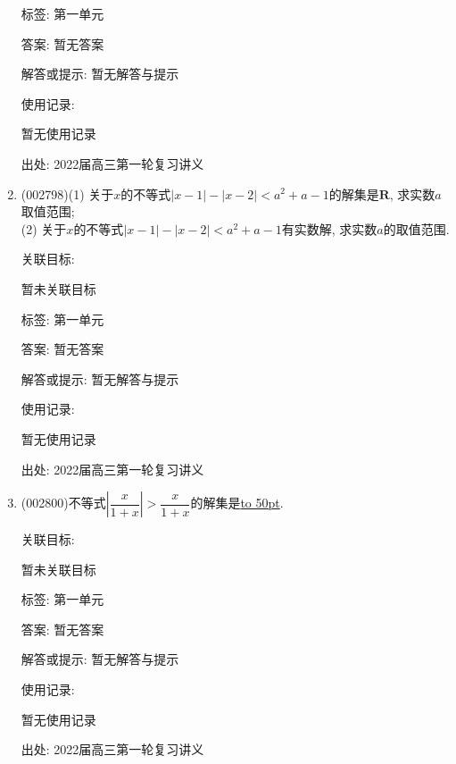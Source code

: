 \documentclass[10pt,a4paper]{article}
\newcommand{\blank}[1]{\underline{\hbox to #1pt{}}}
\begin{document}
\begin{enumerate}[1.]
标签: 第一单元

答案: 暂无答案

解答或提示: 暂无解答与提示

使用记录:

暂无使用记录


出处: 2022届高三第一轮复习讲义
\item { (002798)}(1) 关于$x$的不等式$|x-1|-|x-2|<a^2+a-1$的解集是$\mathbf{R}$, 求实数$a$取值范围;\\
(2) 关于$x$的不等式$|x-1|-|x-2|<a^2+a-1$有实数解, 求实数$a$的取值范围.


关联目标:

暂未关联目标



标签: 第一单元

答案: 暂无答案

解答或提示: 暂无解答与提示

使用记录:

暂无使用记录


出处: 2022届高三第一轮复习讲义
\item { (002800)}不等式$|\dfrac x{1+x}|>\dfrac x{1+x}$的解集是\blank{50}.


关联目标:

暂未关联目标



标签: 第一单元

答案: 暂无答案

解答或提示: 暂无解答与提示

使用记录:

暂无使用记录


出处: 2022届高三第一轮复习讲义
\end{enumerate}
\end{document}
